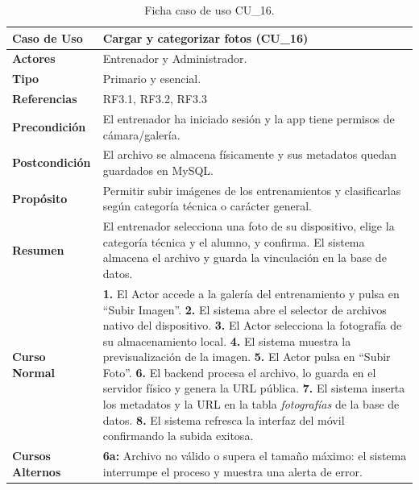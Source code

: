         \clearpage
        \begin{table}[htbp]
        \centering
        \scriptsize
        \renewcommand{\arraystretch}{0.75}
        \begin{tabularx}{\textwidth}{|l|X|}
        \hline
        \rowcolor[HTML]{EFEFEF} 
        \textbf{Caso de Uso} & \textbf{Cargar y categorizar fotos (CU\_16)} \\ \hline
        \textbf{Actores} & Entrenador y Administrador. \\ \hline
        \textbf{Tipo} & Primario y esencial. \\ \hline
        \textbf{Referencias} & RF3.1, RF3.2, RF3.3 \\ \hline
        \textbf{Precondición} & El entrenador ha iniciado sesión y la app tiene permisos de cámara/galería. \\ \hline
        \textbf{Postcondición} & El archivo se almacena físicamente y sus metadatos quedan guardados en MySQL. \\ \hline
        \textbf{Propósito} & Permitir subir imágenes de los entrenamientos y clasificarlas según categoría técnica o carácter general. \\ \hline
        \textbf{Resumen} & El entrenador selecciona una foto de su dispositivo, elige la categoría técnica y el alumno, y confirma. El sistema almacena el archivo y guarda la vinculación en la base de datos. \\ \hline
        \textbf{Curso Normal} & 
        \textbf{1.} El Actor accede a la galería del entrenamiento y pulsa en ``Subir Imagen''.\newline
        \textbf{2.} El sistema abre el selector de archivos nativo del dispositivo.\newline
        \textbf{3.} El Actor selecciona la fotografía de su almacenamiento local.\newline
        \textbf{4.} El sistema muestra la previsualización de la imagen.\newline
        \textbf{5.} El Actor pulsa en ``Subir Foto''.\newline
        \textbf{6.} El backend procesa el archivo, lo guarda en el servidor físico y genera la URL pública.\newline
        \textbf{7.} El sistema inserta los metadatos y la URL en la tabla \textit{fotografías} de la base de datos.\newline
        \textbf{8.} El sistema refresca la interfaz del móvil confirmando la subida exitosa. \\ \hline
        \textbf{Cursos Alternos} & 
        \textbf{6a:} Archivo no válido o supera el tamaño máximo: el sistema interrumpe el proceso y muestra una alerta de error. \\ \hline
        \end{tabularx}
        \caption{Ficha caso de uso CU\_16.}
        \label{tab:cu_16}
        \end{table}


